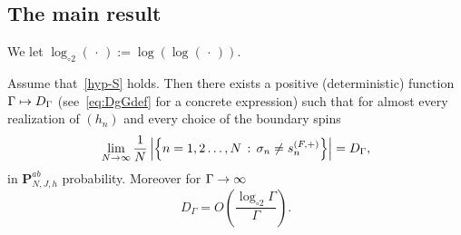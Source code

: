 \documentclass[AHL,Unicode,longabstracts,published]{cedram}
\newcommand{\bP}{\mathbf{P}}
\newcommand{\gG}{\Gamma}
\newcommand{\gs}{\sigma}
\newcommand{\loglog}{\log_{\circ 2}}
\renewcommand*{\to}{\mathchoice{\longrightarrow}{\rightarrow}{\rightarrow}{\rightarrow}}
\let\oldmapsto\mapsto
\renewcommand*{\mapsto}{\mathchoice{\longmapsto}{\oldmapsto}{\oldmapsto}{\oldmapsto}}
\begin{document}
\subsection{The main result}\label{sec:main}
We let $\loglog(\,\cdot\,):= \log(\log(\,\cdot\,))$.


\begin{theo}\label{th:main}
Assume that~\eqref{hyp-S} holds. Then there exists a positive (deterministic) function $\gG \mapsto D_\gG$ (see~\eqref{eq:DgGdef} for a concrete expression) such that for almost every realization of $(h_n)$ and every choice of the boundary spins
\begin{equation}\label{eq:main1}
\lim_{N \to \infty} \frac 1N \left| \left\{ n=1,2 \dots, N\,:\, \gs_n \neq s^{(F, +)}_n\right\} \right| = D_\gG,
\end{equation}
in $\bP^{ab}_{N, J, h}$ probability. Moreover for $\gG \to \infty$
\begin{equation}\label{eq:main2}
D_\gG = O \left(\frac{\loglog \gG }\gG\right).
\end{equation}
\end{theo}
\end{document}
